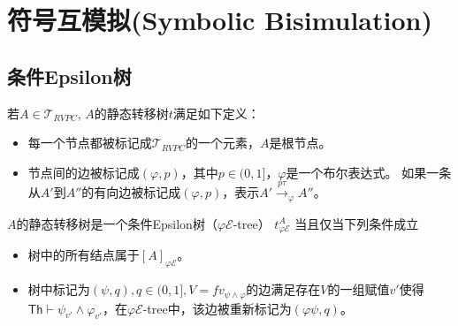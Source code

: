 \section{符号互模拟(Symbolic Bisimulation)}

\subsection{条件Epsilon树}
\begin{definition}
   \label{def:silent_tree}
   若$A\in \mathcal{T}_{RVPC}$,
   $A$的静态转移树$t$满足如下定义：
   \begin{itemize}
   \item 每一个节点都被标记成$\mathcal{T}_{RVPC}$的一个元素，$A$是根节点。
   \item {
      节点间的边被标记成$(\varphi,p)$，其中$p\in(0,1]$，$\varphi$是一个布尔表达式。
      如果一条从$A'$到$A''$的有向边被标记成$(\varphi,p)$，表示$A'\stackrel{p\tau}{\rightarrow}_{\varphi} A''$。
   }
   \end{itemize}
\end{definition}

\begin{definition}
   $A$的静态转移树是一个条件Epsilon树（$\varphi \mathcal{E}$-tree） $t^A_{\varphi \mathcal{E}}$ 
当且仅当下列条件成立
\begin{itemize}
   \item 树中的所有结点属于$[A]_{\varphi \mathcal{E}}$。
   \item 树中标记为$(\psi, q),q\in(0,1],V=fv_{\psi\wedge\varphi}$的边满足存在$V$的一组赋值$v'$使得$\mathsf{Th}\vdash \psi_{v'}\wedge\varphi_{v'}$，在$\varphi\mathcal{E}$-tree中，该边被重新标记为$(\varphi\psi,q)$。
\end{itemize}
\end{definition}

